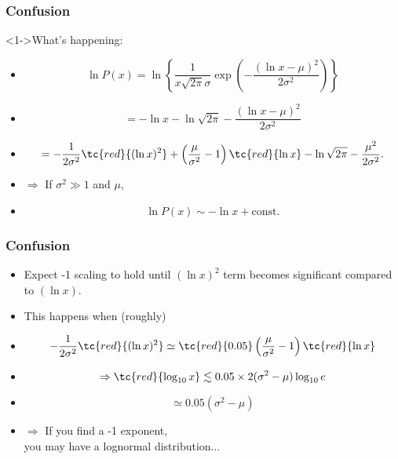 \begin{frame}
  \frametitle{Confusion}

  \begin{block}<1->{What's happening:}
    \begin{itemize}
    \item <2->  $$
      \ln P(x) = 
      \ln 
      \left\{ 
        \frac{1}{x \sqrt{2\pi} \sigma}
        \exp 
        \left(
          -\frac{(\ln x-\mu)^2}
          {2\sigma^2}
        \right)
      \right\}
      $$
    \item<3->    $$
      = -\ln x  
      -\ln \sqrt{2\pi}
      -\frac{(\ln x-\mu)^2}
      {2\sigma^2}
      $$
    \item<4->   $$
      = 
      -\frac{1}
      {2\sigma^2}
      \tc{red}{  (\ln x)^2}
      + \left(
        \frac{\mu}{\sigma^2} - 1
      \right)
      \tc{red}{\ln x  }
      -\ln \sqrt{2\pi}
      -\frac{\mu^2}
      {2\sigma^2}.
      $$
    \item<5-> $\Rightarrow$ If $\sigma^2 \gg 1$ and $\mu$,
    \item<6-> $$
      \boxed{\ln P(x) \sim - \ln {x} + \mbox{const.} }
      $$

    \end{itemize}
  \end{block}

\end{frame}

\begin{frame}
  \frametitle{Confusion}

  \begin{itemize}
  \item<1->   Expect -1 scaling to hold until $(\ln{x})^2$ term 
    becomes significant compared to $(\ln{x})$.
  \item<2->   This happens when (roughly)
  \item<3-> $$
    -\frac{1}
    {2\sigma^2}
    \tc{red}{  (\ln x)^2}
    \simeq
    \tc{red}{0.05}
    \left(
      \frac{\mu}{\sigma^2} - 1
    \right)
    \tc{red}{\ln x  }
    $$
  \item<4->
    $$
    \Rightarrow
    \tc{red}{\log_{10} x}
    \lesssim
    0.05\times2(\sigma^2 - \mu) 
    \log_{10} e
    $$
  \item<5->
    $$
    \simeq 0.05 (\sigma^2 - \mu) 
    $$
  \item<6->
    $\Rightarrow$ If you find a -1 exponent,\\
    \qquad you may have a lognormal distribution...
  \end{itemize}

\end{frame}

